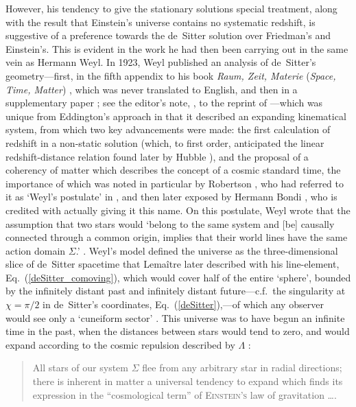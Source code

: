 However, his tendency to give the stationary solutions special treatment, along with the result that Einstein's universe contains no systematic redshift, is suggestive of a preference towards the de~Sitter solution over Friedman's and Einstein's. This is evident in the work he had then been carrying out in the same vein as Hermann Weyl. In 1923, Weyl published an analysis of de~Sitter's geometry---first, in the fifth appendix to his book \textit{Raum, Zeit, Materie} (\textit{Space, Time, Matter}) \cite{Weyl1923a}, which was never translated to English, and then in a supplementary paper \cite{Weyl1923,Weyl2009}; see the editor's note, \cite{Ehlers2009}, to the reprint of \cite{Weyl1923}---which was unique from Eddington's approach in that it described an expanding kinematical system, from which two key advancements were made: the first calculation of redshift in a non-static solution (which, to first order, anticipated the linear redshift-distance relation found later by Hubble \cite{Hubble1929}), and the proposal of a coherency of matter which describes the concept of a cosmic standard time, the importance of which was noted in particular by Robertson \cite{Robertson1929,Robertson1933}, who had referred to it as `Weyl's postulate' in \cite{Robertson1933}, and then later exposed by Hermann Bondi \cite{Bondi1961}, who is credited with actually giving it this name. On this postulate, Weyl wrote that the assumption that two stars would `belong to the same system and [be] causally connected through a common origin, implies that their world lines have the same action domain $\Sigma$.' \cite{Weyl2009}. Weyl's model defined the universe as the three-dimensional slice of de~Sitter spacetime that Lema\^{i}tre later described with his line-element, Eq.~(\ref{deSitter_comoving}), which would cover half of the entire `sphere', bounded by the infinitely distant past and infinitely distant future---c.f.~the singularity at $\chi=\pi/2$ in de~Sitter's coordinates, Eq.~(\ref{deSitter}),---of which any observer would see only a `cuneiform sector' \cite{Weyl1930}. This universe was to have begun an infinite time in the past, when the distances between stars would tend to zero, and would expand according to the cosmic repulsion described by $\Lambda$ \cite{Weyl2009}:
\begin{quote}
All stars of our system $\Sigma$ flee from any arbitrary star in radial directions; there is inherent in matter a universal tendency to expand which finds its expression in the ``cosmological term'' of \textsc{Einstein's} law of gravitation \ldots.
\end{quote}

